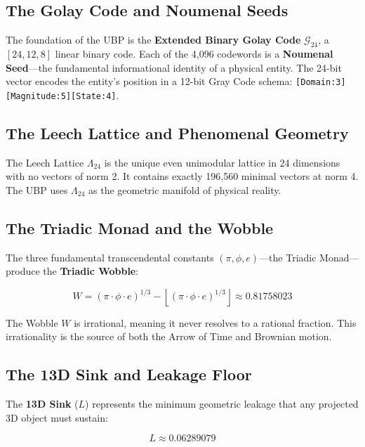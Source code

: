 \documentclass[12pt,a4paper]{article}
\begin{document}
\subsection{The Golay Code and Noumenal Seeds}

The foundation of the UBP is the \textbf{Extended Binary Golay Code} $\mathcal{G}_{24}$, a $[24, 12, 8]$ linear binary code. Each of the 4,096 codewords is a \textbf{Noumenal Seed}---the fundamental informational identity of a physical entity. The 24-bit vector encodes the entity's position in a 12-bit Gray Code schema: \texttt{[Domain:3][Magnitude:5][State:4]}.

\subsection{The Leech Lattice and Phenomenal Geometry}

The Leech Lattice $\Lambda_{24}$ is the unique even unimodular lattice in 24 dimensions with no vectors of norm 2. It contains exactly 196,560 minimal vectors at norm 4. The UBP uses $\Lambda_{24}$ as the geometric manifold of physical reality.

\subsection{The Triadic Monad and the Wobble}

The three fundamental transcendental constants $(\pi, \phi, e)$---the Triadic Monad---produce the \textbf{Triadic Wobble}:

\begin{equation}
W = \left(\pi \cdot \phi \cdot e\right)^{1/3} - \left\lfloor \left(\pi \cdot \phi \cdot e\right)^{1/3} \right\rfloor \approx 0.81758023
\end{equation}

The Wobble $W$ is irrational, meaning it never resolves to a rational fraction. This irrationality is the source of both the Arrow of Time and Brownian motion.

\subsection{The 13D Sink and Leakage Floor}

The \textbf{13D Sink} ($L$) represents the minimum geometric leakage that any projected 3D object must sustain:

\begin{equation}
L \approx 0.06289079
\end{equation}
\end{document}
